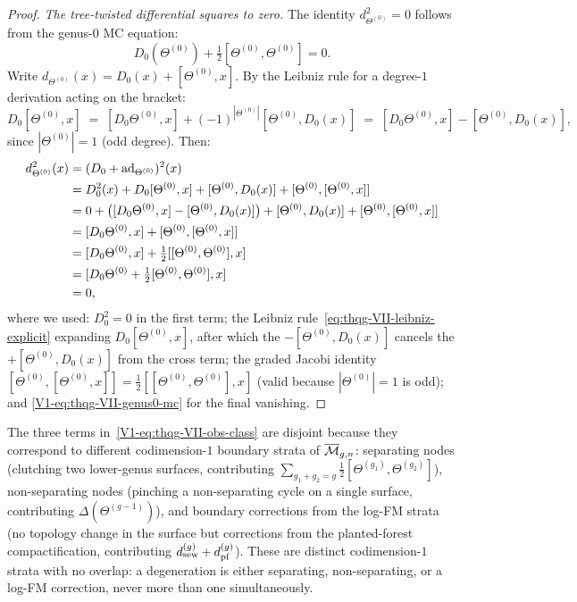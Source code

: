 \begin{proof}
\medskip\noindent\emph{The tree-twisted differential squares to zero.}
The identity $d_{\Theta^{(0)}}^2 = 0$ follows from the genus-$0$ MC equation:
\begin{equation}%
D_0(\Theta^{(0)}) + \tfrac{1}{2}[\Theta^{(0)},\Theta^{(0)}] = 0.
\end{equation}
Write $d_{\Theta^{(0)}}(x) = D_0(x) + [\Theta^{(0)}, x]$.
By the Leibniz rule for a degree-$1$ derivation acting on the bracket:
\begin{equation}\label{eq:thqg-VII-leibniz-explicit}
D_0[\Theta^{(0)}, x]
\;=\;
[D_0\Theta^{(0)}, x]
+ (-1)^{|\Theta^{(0)}|}[\Theta^{(0)}, D_0(x)]
\;=\;
[D_0\Theta^{(0)}, x]
- [\Theta^{(0)}, D_0(x)],
\end{equation}
since $|\Theta^{(0)}| = 1$ (odd degree).
Then:
\begin{align}
d_{\Theta^{(0)}}^2(x)
&= (D_0 + \operatorname{ad}_{\Theta^{(0)}})^2(x)\notag\\
&= D_0^2(x) + D_0[\Theta^{(0)},x]
 + [\Theta^{(0)}, D_0(x)]
 + [\Theta^{(0)},[\Theta^{(0)},x]]\notag\\
&= 0
 + \bigl([D_0\Theta^{(0)}, x]
 - [\Theta^{(0)}, D_0(x)]\bigr)
 + [\Theta^{(0)}, D_0(x)]
 + [\Theta^{(0)},[\Theta^{(0)},x]]\notag\\
&= [D_0\Theta^{(0)}, x]
 + [\Theta^{(0)},[\Theta^{(0)},x]]\notag\\
&= [D_0\Theta^{(0)}, x]
 + \tfrac{1}{2}[[\Theta^{(0)},\Theta^{(0)}], x]\notag\\
&= [D_0\Theta^{(0)}
 + \tfrac{1}{2}[\Theta^{(0)},\Theta^{(0)}], x]\notag\\
&= 0,
\end{align}
where we used: $D_0^2 = 0$ in the first term; the Leibniz
rule~\eqref{eq:thqg-VII-leibniz-explicit} expanding
$D_0[\Theta^{(0)},x]$, after which the
$-[\Theta^{(0)}, D_0(x)]$ cancels the $+[\Theta^{(0)}, D_0(x)]$
from the cross term; the graded Jacobi identity
$[\Theta^{(0)},[\Theta^{(0)},x]] = \tfrac{1}{2}
[[\Theta^{(0)},\Theta^{(0)}], x]$
(valid because $|\Theta^{(0)}| = 1$ is odd); and
\eqref{V1-eq:thqg-VII-genus0-mc} for the final vanishing.
\end{proof}

\begin{remark}
The three terms in~\eqref{V1-eq:thqg-VII-obs-class} are disjoint
because they correspond to different codimension-$1$ boundary strata
of $\overline{\mathcal{M}}_{g,n}$: separating nodes (clutching two
lower-genus surfaces, contributing
$\sum_{g_1+g_2=g} \tfrac{1}{2}[\Theta^{(g_1)},\Theta^{(g_2)}]$),
non-separating nodes (pinching a non-separating cycle on a single
surface, contributing $\Delta(\Theta^{(g-1)})$), and boundary
corrections from the log-FM strata (no topology change in the
surface but corrections from the planted-forest compactification,
contributing $d_{\mathrm{sew}}^{(g)} + d_{\mathrm{pf}}^{(g)}$). These are distinct
codimension-$1$ strata with no overlap: a degeneration is either
separating, non-separating, or a log-FM correction, never more
than one simultaneously.
\end{remark}


